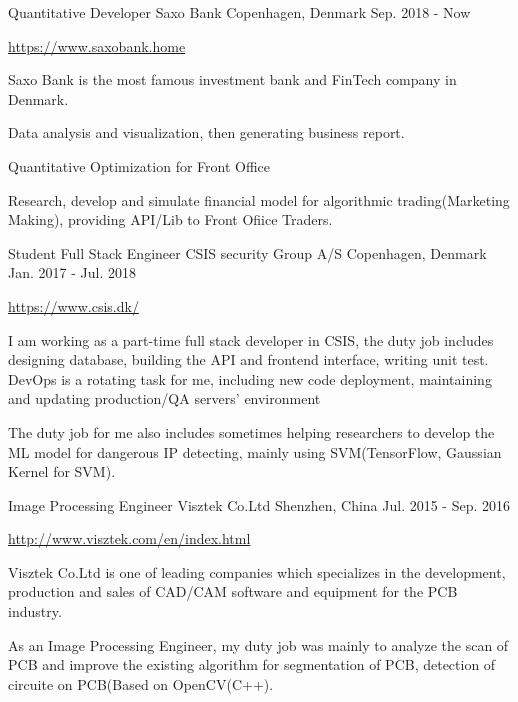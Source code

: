 \begin{cventries}
  \cventry
    {Quantitative Developer}
    {Saxo Bank}
    {Copenhagen, Denmark}
    {Sep. 2018 - Now}
    {
	    \begin{cvitems}
            \item {\url{https://www.saxobank.home}}
            \item {Saxo Bank is the most famous investment bank and FinTech company in Denmark.}
	    \item {Data analysis and visualization, then generating business report.}
	    \item {Quantitative Optimization for Front Office}
            \item {Research, develop and simulate financial model for algorithmic trading(Marketing Making), providing API/Lib to Front Ofiice Traders.}
	    \end{cvitems}
    }
  \cventry
    {Student Full Stack Engineer}
    {CSIS security Group A/S}
    {Copenhagen, Denmark}
    {Jan. 2017 - Jul. 2018}
    {
      \begin{cvitems}
        \item {\url{https://www.csis.dk/}}
        \item {I am working as a part-time full stack developer in CSIS, the duty job includes designing database, building the API and frontend interface, writing unit test. DevOps is a rotating task for me, including new code deployment, maintaining and updating production/QA servers' environment}
	\item {The duty job for me also includes sometimes helping researchers to develop the ML model for dangerous IP detecting, mainly using SVM(TensorFlow, Gaussian Kernel for SVM).}
      \end{cvitems}
    }
  \cventry
    {Image Processing Engineer}
    {Visztek Co.Ltd}
    {Shenzhen, China}
    {Jul. 2015 - Sep. 2016}
    {
      \begin{cvitems}
        \item {\url{http://www.visztek.com/en/index.html}}
        \item {Visztek Co.Ltd is one of leading companies which specializes in the development, production and sales of CAD/CAM software and equipment for the PCB industry.}
	\item {As an Image Processing Engineer, my duty job was mainly to analyze the scan of PCB and improve the existing algorithm for segmentation of PCB, detection of circuite on PCB(Based on OpenCV(C++).}

\end{cvitems}}
\end{cventries}
